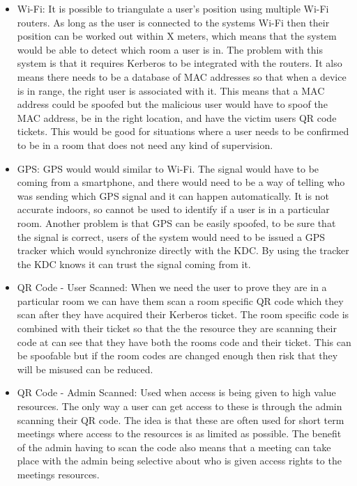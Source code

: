 \documentclass[]{report}   %
\begin{document}
\begin{itemize}

\item Wi-Fi: It is possible to triangulate a user’s position using multiple Wi-Fi routers. As long as the user is connected to the systems Wi-Fi then their position can be worked out within X meters, which means that the system would be able to detect which room a user is in. The problem with this system is that it requires Kerberos to be integrated with the routers. It also means there needs to be a database of MAC addresses so that when a device is in range, the right user is associated with it. This means that a MAC address could be spoofed but the malicious user would have to spoof the MAC address, be in the right location, and have the victim users QR code tickets. This would be good for situations where a user needs to be confirmed to be in a room that does not need any kind of supervision.

\item GPS: GPS would would similar to Wi-Fi. The signal would have to be coming from a smartphone, and there would need to be a way of telling who was sending which GPS signal and it can happen automatically. It is not accurate indoors, so cannot be used to identify if a user is in a particular room. Another problem is that GPS can be easily spoofed, to be sure that the signal is correct, users of the system would need to be issued a GPS tracker which would synchronize directly with the KDC. By using the tracker the KDC knows it can trust the signal coming from it.

\item QR Code - User Scanned: When we need the user to prove they are in a particular room we can have them scan a room specific QR code which they scan after they have acquired their Kerberos ticket. The room specific code is combined with their ticket so that the the resource they are scanning their code at can see that they have both the rooms code and their ticket. This can be spoofable but if the room codes are changed enough then risk that they will be misused can be reduced.

\item QR Code - Admin Scanned: Used when access is being given to high value resources. The only way a user can get access to these is through the admin scanning their QR code. The idea is that these are often used for short term meetings where access to the resources is as limited as possible. The benefit of the admin having to scan the code also means that a meeting can take place with the admin being selective about who is given access rights to the meetings resources.

\end{itemize}
\end{document}
